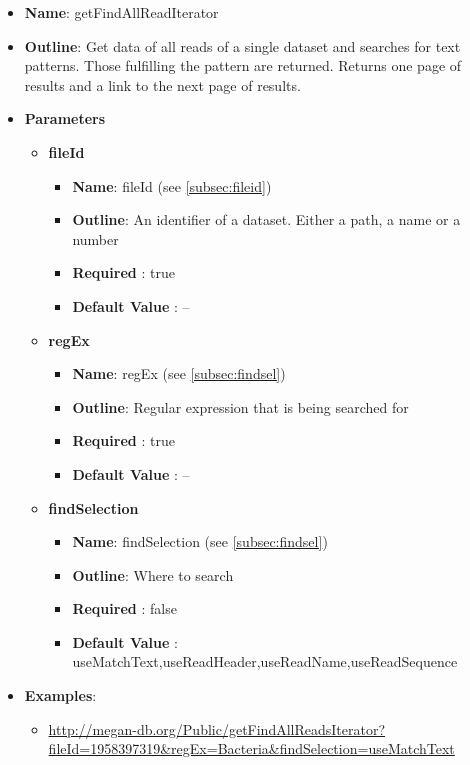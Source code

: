 \documentclass[11pt]{article}
\begin{document}
\begin{itemize}
	\item \textbf{Name}: getFindAllReadIterator
	\item \textbf{Outline}: Get data of all reads of a single dataset and searches for text patterns. Those fulfilling the pattern are returned. Returns one page of results and a link to the next page of results.
	\item \textbf{Parameters}
		\begin{itemize}
			\item \textbf{fileId}
				\begin{itemize}
					\item \textbf{Name}: fileId (see \ref{subsec:fileid})
					\item \textbf{Outline}: An identifier of a dataset. Either a path, a name or a number
					\item \textbf{Required} : true
					\item \textbf{Default Value} : --
				\end{itemize}
			\item \textbf{regEx}
				\begin{itemize}
					\item \textbf{Name}: regEx (see \ref{subsec:findsel})
					\item \textbf{Outline}: Regular expression that is being searched for
					\item \textbf{Required} : true
					\item \textbf{Default Value} : --
				\end{itemize}
			\item \textbf{findSelection}
				\begin{itemize}
					\item \textbf{Name}: findSelection (see \ref{subsec:findsel})
					\item \textbf{Outline}: Where to search
					\item \textbf{Required} : false
					\item \textbf{Default Value} : useMatchText,useReadHeader,useReadName,useReadSequence
				\end{itemize}

		\end{itemize}
	\item \textbf{Examples}:
		\begin{itemize}
			\item \url{http://megan-db.org/Public/getFindAllReadsIterator?fileId=1958397319&regEx=Bacteria&findSelection=useMatchText}
		\end{itemize}
\end{itemize}
\end{document}
